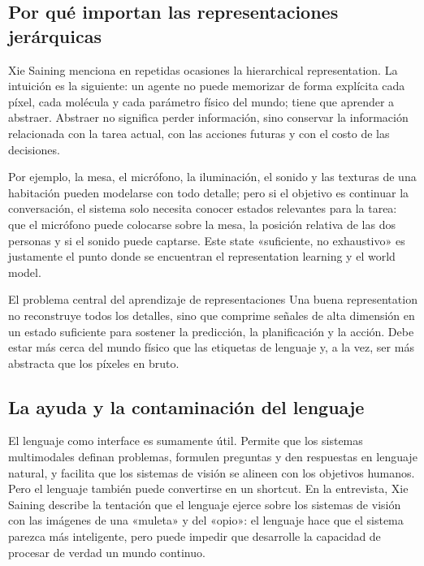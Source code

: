 \subsection{Por qué importan las representaciones jerárquicas}

Xie Saining menciona en repetidas ocasiones la hierarchical representation. La intuición es la siguiente: un agente no puede memorizar de forma explícita cada píxel, cada molécula y cada parámetro físico del mundo; tiene que aprender a abstraer. Abstraer no significa perder información, sino conservar la información relacionada con la tarea actual, con las acciones futuras y con el costo de las decisiones.

Por ejemplo, la mesa, el micrófono, la iluminación, el sonido y las texturas de una habitación pueden modelarse con todo detalle; pero si el objetivo es continuar la conversación, el sistema solo necesita conocer estados relevantes para la tarea: que el micrófono puede colocarse sobre la mesa, la posición relativa de las dos personas y si el sonido puede captarse. Este state «suficiente, no exhaustivo» es justamente el punto donde se encuentran el representation learning y el world model.

\begin{importantbox}{El problema central del aprendizaje de representaciones}
Una buena representation no reconstruye todos los detalles, sino que comprime señales de alta dimensión en un estado suficiente para sostener la predicción, la planificación y la acción. Debe estar más cerca del mundo físico que las etiquetas de lenguaje y, a la vez, ser más abstracta que los píxeles en bruto.
\end{importantbox}

\subsection{La ayuda y la contaminación del lenguaje}

El lenguaje como interface es sumamente útil. Permite que los sistemas multimodales definan problemas, formulen preguntas y den respuestas en lenguaje natural, y facilita que los sistemas de visión se alineen con los objetivos humanos. Pero el lenguaje también puede convertirse en un shortcut. En la entrevista, Xie Saining describe la tentación que el lenguaje ejerce sobre los sistemas de visión con las imágenes de una «muleta» y del «opio»: el lenguaje hace que el sistema parezca más inteligente, pero puede impedir que desarrolle la capacidad de procesar de verdad un mundo continuo.


